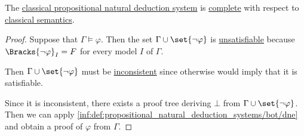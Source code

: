 \begin{theorem}\label{thm:classical_propositional_completeness}
  The \hyperref[def:propositional_natural_deduction_systems]{classical propositional natural deduction system} is \hyperref[def:logical_framework/completeness]{complete} with respect to \hyperref[def:propositional_semantics/classical]{classical semantics}.
\end{theorem}
\begin{proof}
  Suppose that \( \Gamma \vDash \varphi \). Then the set \( \Gamma \cup \set{ \neg \varphi } \) is \hyperref[def:satisfiable_set_of_sentences]{unsatisfiable} because \( \Bracks{\neg \varphi}_I = F \) for every model \( I \) of \( \Gamma \).

  Then \( \Gamma \cup \set{ \neg \varphi } \) must be \hyperref[def:consistent_set_of_sentences]{inconsistent} since otherwise  would imply that it is satisfiable.

  Since it is inconsistent, there exists a proof tree deriving \( \bot \) from \( \Gamma \cup \set{ \neg \varphi } \). Then we can apply \ref{inf:def:propositional_natural_deduction_systems/bot/dne} and obtain a proof of \( \varphi \) from \( \Gamma \).
\end{proof}
